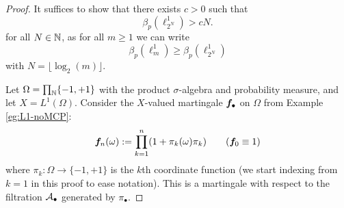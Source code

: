 \begin{proof}
  It suffices to show that there exists $c > 0$ such that
  \begin{equation*}
    \beta_{p}(\ell^{1}_{2^N}) > cN.
  \end{equation*}
  for all $N \in \mathbb{N}$, as for all $m \geq 1$ we can write
  \begin{equation*}
    \beta_{p}(\ell^1_{m}) \geq \beta_{p}(\ell^1_{2^N})
  \end{equation*}
  with $N = \lfloor \log_{2}(m) \rfloor$.

  Let $\Omega = \prod_{\mathbb{N}} \{-1,+1\}$ with the product $\sigma$-algebra and probability measure, and let $X = L^1(\Omega)$.
  Consider the $X$-valued martingale $\bm{f}_{\bullet}$ on $\Omega$ from Example \ref{eg:L1-noMCP}:
  \begin{equation*}
    \bm{f}_{n}(\omega) := \prod_{k = 1}^{n} (1 + \pi_{k}(\omega)\pi_{k})  \qquad (\bm{f}_{0} \equiv 1)
  \end{equation*}
  where $\pi_{k} \colon \Omega \to \{-1,+1\}$ is the $k$th coordinate function (we start indexing from $k = 1$ in this proof to ease notation).
  This is a martingale with respect to the filtration $\mathcal{A}_{\bullet}$ generated by $\pi_{\bullet}$.
  

\end{proof}
